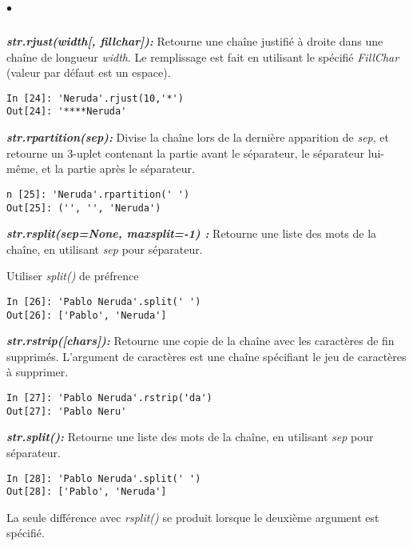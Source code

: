 \documentclass[10pt,dvipsnames,  dvips]{article}
\begin{document}
\begin{list}{$\bullet$}{}
\begin{lstlisting}
\end{lstlisting}
\item \textit{\textbf{str.rjust(width[, fillchar]): }} Retourne une chaîne justifié à droite dans une chaîne de longueur \textit{width}. Le remplissage est fait en utilisant le spécifié \textit{FillChar} (valeur par défaut est un espace).
\begin{lstlisting}
In [24]: 'Neruda'.rjust(10,'*')
Out[24]: '****Neruda'
\end{lstlisting}
\item \textit{\textbf{str.rpartition(sep): }} Divise la chaîne lors de la dernière apparition de \textit{sep}, et retourne un 3-uplet contenant la partie avant le séparateur, le séparateur lui-même, et la partie après le séparateur.
\begin{lstlisting}
n [25]: 'Neruda'.rpartition(' ')
Out[25]: ('', '', 'Neruda')
\end{lstlisting}
\item \textit{\textbf{str.rsplit(sep=None, maxsplit=-1) : }} Retourne une liste des mots de la chaîne, en utilisant \textit{sep} pour séparateur.

Utiliser \textit{split()} de préfrence
\begin{lstlisting}
In [26]: 'Pablo Neruda'.split(' ')
Out[26]: ['Pablo', 'Neruda']
\end{lstlisting}
\item \textit{\textbf{str.rstrip([chars]): }} Retourne une copie de la chaîne avec les caractères de fin supprimés. L'argument de caractères est une chaîne spécifiant le jeu de caractères à supprimer.
\begin{lstlisting}
In [27]: 'Pablo Neruda'.rstrip('da')
Out[27]: 'Pablo Neru'
\end{lstlisting}
\item \textit{\textbf{str.split(): }} Retourne une liste des mots de la chaîne, en utilisant \textit{sep} pour séparateur.


\begin{lstlisting}
In [28]: 'Pablo Neruda'.split(' ')
Out[28]: ['Pablo', 'Neruda']
\end{lstlisting}


La seule différence avec  \textit{rsplit()} se produit lorsque le deuxième argument est spécifié.


\end{list}
\end{document}
